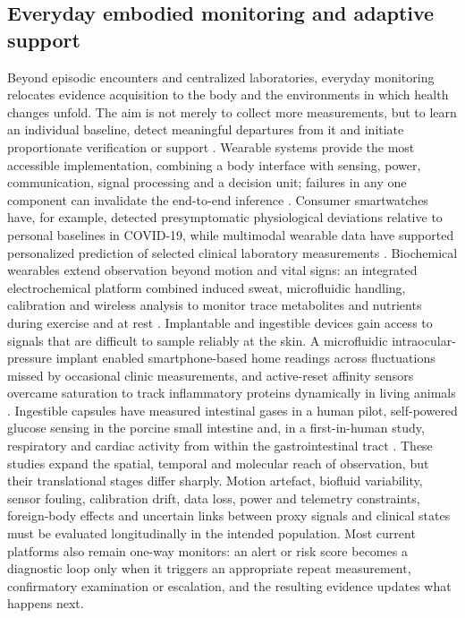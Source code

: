 \subsection{Everyday embodied monitoring and adaptive support}
\label{subsec:everyday_monitoring}

Beyond episodic encounters and centralized laboratories, everyday monitoring relocates evidence acquisition to the body and the environments in which health changes unfold. The aim is not merely to collect more measurements, but to learn an individual baseline, detect meaningful departures from it and initiate proportionate verification or support \cite{Gambhir2021ContinuousMonitoring}. Wearable systems provide the most accessible implementation, combining a body interface with sensing, power, communication, signal processing and a decision unit; failures in any one component can invalidate the end-to-end inference \cite{Ates2022WearableSensors}. Consumer smartwatches have, for example, detected presymptomatic physiological deviations relative to personal baselines in COVID-19, while multimodal wearable data have supported personalized prediction of selected clinical laboratory measurements \cite{Mishra2020SmartwatchCOVID,Dunn2021WearablePredictions}. Biochemical wearables extend observation beyond motion and vital signs: an integrated electrochemical platform combined induced sweat, microfluidic handling, calibration and wireless analysis to monitor trace metabolites and nutrients during exercise and at rest \cite{Wang2022WearableBiosensor}. Implantable and ingestible devices gain access to signals that are difficult to sample reliably at the skin. A microfluidic intraocular-pressure implant enabled smartphone-based home readings across fluctuations missed by occasional clinic measurements, and active-reset affinity sensors overcame saturation to track inflammatory proteins dynamically in living animals \cite{Araci2014ImplantableIOP,Zargartalebi2024ActiveReset}. Ingestible capsules have measured intestinal gases in a human pilot, self-powered glucose sensing in the porcine small intestine and, in a first-in-human study, respiratory and cardiac activity from within the gastrointestinal tract \cite{KalantarZadeh2018IngestibleGas,DelaPaz2022IngestibleBiosensing,Traverso2023IngestibleVitals}. These studies expand the spatial, temporal and molecular reach of observation, but their translational stages differ sharply. Motion artefact, biofluid variability, sensor fouling, calibration drift, data loss, power and telemetry constraints, foreign-body effects and uncertain links between proxy signals and clinical states must be evaluated longitudinally in the intended population. Most current platforms also remain one-way monitors: an alert or risk score becomes a diagnostic loop only when it triggers an appropriate repeat measurement, confirmatory examination or escalation, and the resulting evidence updates what happens next.


